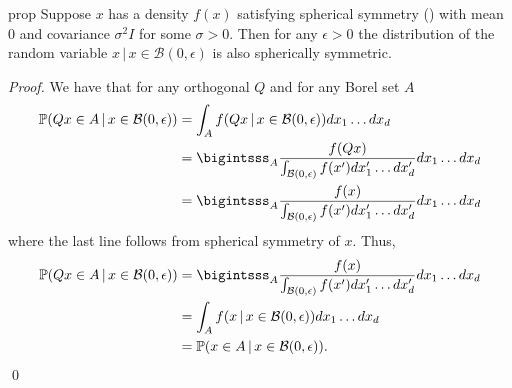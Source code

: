 \documentclass[11pt]{article}
\begin{document}

\begin{restatable}{prop}{} \label{prop: conditional spherical symmetry}
    Suppose $x$ has a density $f(x)$ satisfying spherical symmetry () with mean $0$ and covariance $\sigma^2I$ for some $\sigma > 0$. Then for any $\epsilon > 0$ the distribution of the random variable $x \,| \, x \in \mathcal{B}(0, \epsilon)$ is also spherically symmetric. 
\end{restatable}
\noindent \textit{Proof.} We have that for any orthogonal $Q$ and for any Borel set $A$
\begin{align*}
    \mathbb{P}(Qx \in A \, | \, x \in \mathcal{B}(0,\epsilon) ) &= \int_{A}f(Qx\,|\,x \in \mathcal{B}(0,\epsilon))dx_1\dots dx_d \\
    &= \bigintsss_{A}\frac{f(Qx) }{\int_{\mathcal{B}(0,\epsilon)}f(x')dx'_1 \dots dx'_d}dx_1\dots dx_d \\
    &= \bigintsss_{A}\frac{f(x) }{\int_{\mathcal{B}(0,\epsilon)}f(x')dx'_1 \dots dx'_d}dx_1\dots dx_d
\end{align*}
where the last line follows from spherical symmetry of $x$. Thus,
\begin{align*}
    \mathbb{P}(Qx \in A \, | \, x \in \mathcal{B}(0,\epsilon) ) &= \bigintsss_{A}\frac{f(x) }{\int_{\mathcal{B}(0,\epsilon)}f(x')dx'_1 \dots dx'_d}dx_1\dots dx_d \\
    &= \int_{A}f(x\,|\,x \in \mathcal{B}(0,\epsilon))dx_1\dots dx_d \\
    &= \mathbb{P}(x \in A \, | \, x \in \mathcal{B}(0,\epsilon) ).
\end{align*}
\qed{}
\end{document}
